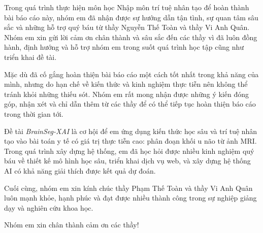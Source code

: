 \documentclass[
12pt,
oneside,
english,
doublespacing,
nolistspacing,
liststotoc,
parskip,
headsepline,
chapterinoneline,
]{HUSdissertation}
\begin{document}
\lstset{style=codePython}

\frontmatter

\pagestyle{plain}













\begin{acknowledgements}
	\addchaptertocentry{\acknowledgementname}
	\thispagestyle{empty}

	Trong quá trình thực hiện môn học Nhập môn trí tuệ nhân tạo để hoàn thành bài báo cáo này, nhóm em đã nhận được sự hướng dẫn tận tình, sự quan tâm sâu sắc và những hỗ trợ quý báu từ thầy Nguyễn Thế Toàn và thầy Vi Anh Quân. Nhóm em xin gửi lời cảm ơn chân thành và sâu sắc đến các thầy vì đã luôn đồng hành, định hướng và hỗ trợ nhóm em trong suốt quá trình học tập cũng như triển khai đề tài.

	Mặc dù đã cố gắng hoàn thiện bài báo cáo một cách tốt nhất trong khả năng của mình, nhưng do hạn chế về kiến thức và kinh nghiệm thực tiễn nên không thể tránh khỏi những thiếu sót. Nhóm em rất mong nhận được những ý kiến đóng góp, nhận xét và chỉ dẫn thêm từ các thầy để có thể tiếp tục hoàn thiện báo cáo trong thời gian tới.

	Đề tài \textit{BrainSeg-XAI} là cơ hội để em ứng dụng kiến thức học sâu và trí tuệ nhân tạo vào bài toán y tế có giá trị thực tiễn cao: phân đoạn khối u não từ ảnh MRI. Trong quá trình xây dựng hệ thống, em đã học hỏi được nhiều kinh nghiệm quý báu về thiết kế mô hình học sâu, triển khai dịch vụ web, và xây dựng hệ thống AI có khả năng giải thích được kết quả dự đoán.

	Cuối cùng, nhóm em xin kính chúc thầy Phạm Thế Toàn và thầy Vi Anh Quân luôn mạnh khỏe, hạnh phúc và đạt được nhiều thành công trong sự nghiệp giảng dạy và nghiên cứu khoa học.

	Nhóm em xin chân thành cảm ơn các thầy!
\end{acknowledgements}
\end{document}
